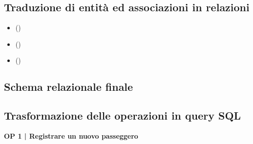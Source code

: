 




\newpage

\subsection{Traduzione di entità ed associazioni in relazioni}


\begin{itemize}
	\item \textbf{\small } \textsf{\small ()}
	\item \textbf{\small } \textsf{\small ()}
	\item \textbf{\small } \textsf{\small ()}
\end{itemize}


\newpage

\subsection{Schema relazionale finale} %



\newpage

\subsection{Trasformazione delle operazioni in query SQL}


\textbf{\small OP 1 | Registrare un nuovo passeggero}


